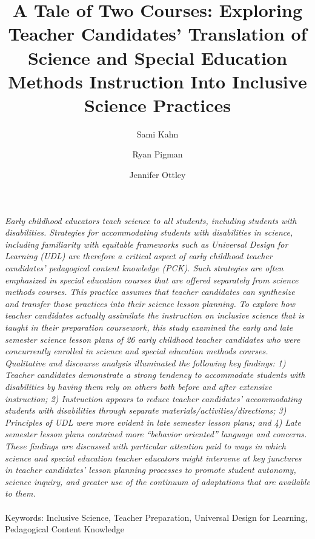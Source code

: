 \documentclass[11.5pt]{sig-alternate} %
\makeatletter
\let\oldabstract\abstract
\let\oldendabstract\endabstract
\renewenvironment{abstract} %
{\renewenvironment{quotation}%
               {\list{}{\addtolength{\leftmargin}{1em} %
                        \listparindent 1.5em%
                        \itemindent    \listparindent%
                        \rightmargin   \leftmargin%
                        \parsep        \z@ \@plus\p@}%
                \item\relax}%
               {\endlist}%
\oldabstract}
{\oldendabstract}
\makeatother
\begin{document}
\title{A Tale of Two Courses: Exploring Teacher Candidates’ Translation of Science and Special Education Methods Instruction Into Inclusive Science Practices}

\author[1]{\large \color{blue}Sami Kahn}
\author[1]{\large \color{blue}Ryan Pigman}
\author[1]{\large \color{blue}Jennifer Ottley}


\toappear{}
\maketitle
\begin{@twocolumnfalse} 
\begin{abstract}
\item 
\textit{Early childhood educators teach science to all students, including students with disabilities. Strategies for accommodating students with disabilities in science, including familiarity with equitable frameworks such as Universal Design for Learning (UDL) are therefore a critical aspect of early childhood teacher candidates’ pedagogical content knowledge (PCK). Such strategies are often emphasized in special education courses that are offered separately from science methods courses. This practice assumes that teacher candidates can synthesize and transfer those practices into their science lesson planning. To explore how teacher candidates actually assimilate the instruction on inclusive science that is taught in their preparation coursework, this study examined the early and late semester science lesson plans of 26 early childhood teacher candidates who were concurrently enrolled in science and special education methods courses. Qualitative and discourse analysis illuminated the following key findings: 1) Teacher candidates demonstrate a strong tendency to accommodate students with disabilities by having them rely on others both before and after extensive instruction; 2) Instruction appears to reduce teacher candidates’ accommodating students with disabilities through separate materials/activities/directions; 3) Principles of UDL were more evident in late semester lesson plans; and 4) Late semester lesson plans contained more “behavior oriented” language and concerns. These findings are discussed with particular attention paid to ways in which science and special education teacher educators might intervene at key junctures in teacher candidates’ lesson planning processes to promote student autonomy, science inquiry, and greater use of the continuum of adaptations that are available to them.}
\\ \\
Keywords: Inclusive Science, Teacher Preparation, Universal Design for Learning, Pedagogical Content Knowledge
\end{abstract}
\end{@twocolumnfalse}
\end{document}
